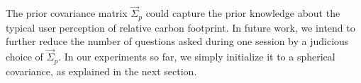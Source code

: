 The prior covariance matrix $\vec{\Sigma}_p$ could capture the prior knowledge about the typical user perception of relative carbon footprint.
In future work, we intend to further reduce the number of questions asked during one session by a judicious choice of $\vec{\Sigma}_p$.
In our experiments so far, we simply initialize it to a spherical covariance, as explained in the next section.

